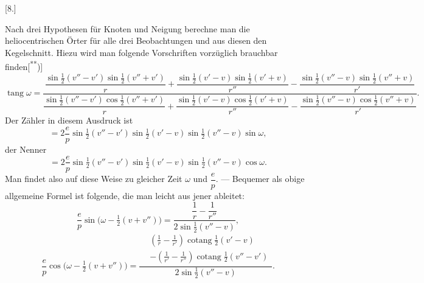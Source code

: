 \clearpage\begingroup{}
\begin{center}
[8.]\par\medskip
{}
\end{center}
\noindent{\small [S. 7]}\par
\noindent\hspace*{\parindent}Nach drei Hypothesen für Knoten und Neigung berechne man die heliocentrischen Örter für alle drei Beobachtungen und aus diesen den Kegelschnitt. Hiezu wird man folgende Vorschriften vorzüglich brauchbar finden[\textsuperscript{**})]
\begingroup\renewcommand{\thefootnote}{}\endgroup
{\small
\[
\operatorname{tang}\omega=
\frac{\dfrac{\sin\tfrac12(v''-v')\sin\tfrac12(v''+v')}{r}
+\dfrac{\sin\tfrac12(v'-v)\sin\tfrac12(v'+v)}{r''}
-\dfrac{\sin\tfrac12(v''-v)\sin\tfrac12(v''+v)}{r'}}
{\dfrac{\sin\tfrac12(v''-v')\cos\tfrac12(v''+v')}{r}
+\dfrac{\sin\tfrac12(v'-v)\cos\tfrac12(v'+v)}{r''}
-\dfrac{\sin\tfrac12(v''-v)\cos\tfrac12(v''+v)}{r'}}.
\]
}
\noindent Der Zähler in diesem Ausdruck ist
\[
=2\frac ep\sin\tfrac12(v''-v')\sin\tfrac12(v'-v)\sin\tfrac12(v''-v)\sin\omega,
\]
\noindent der Nenner
\[
=2\frac ep\sin\tfrac12(v''-v')\sin\tfrac12(v'-v)\sin\tfrac12(v''-v)\cos\omega.
\]
\clearpage
{}
\noindent\hspace*{\parindent}Man findet also auf diese Weise zu gleicher Zeit $\omega$ und $\dfrac ep$. — Bequemer als obige allgemeine Formel ist folgende, die man leicht aus jener ableitet:
\[
\frac ep\sin\bigl(\omega-\tfrac12(v+v'')\bigr)
=\frac{\dfrac1r-\dfrac1{r''}}{2\sin\tfrac12(v''-v)},
\]
\[
\frac ep\cos\bigl(\omega-\tfrac12(v+v'')\bigr)
=\frac{\begin{aligned}
&\left(\frac1r-\frac1{r'}\right)\operatorname{cotang}\frac12(v'-v)\\
&-\left(\frac1{r'}-\frac1{r''}\right)\operatorname{cotang}\frac12(v''-v')
\end{aligned}}{2\sin\tfrac12(v''-v)}.
\]

